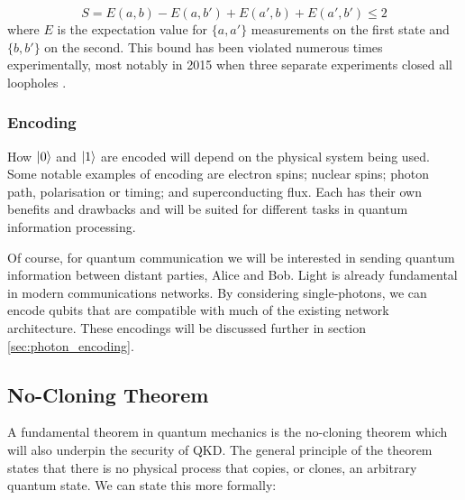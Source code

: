 \begin{equation}
	S = E(a,b) - E(a, b') + E(a',b) + E(a',b') \le 2
\end{equation}
where $E$ is the expectation value for $\{a,a'\}$ measurements on the first state and $\{b,b'\}$ on the second. This bound has been violated numerous times experimentally, most notably in 2015 when three separate experiments closed all loopholes \cite{Giustina2015, shalm2015, hensen2015}.

\subsubsection{Encoding}

How $\ket{0}$ and $\ket{1}$ are encoded will depend on the physical system being used. Some notable examples of encoding are electron spins; nuclear spins; photon path, polarisation or timing; and superconducting flux. Each has their own benefits and drawbacks and will be suited for different tasks in quantum information processing. 

Of course, for quantum communication we will be interested in sending quantum information between distant parties, Alice and Bob. Light is already fundamental in modern communications networks. By considering single-photons, we can encode qubits that are compatible with much of the existing network architecture. These encodings will be discussed further in section \ref{sec:photon_encoding}.




\subsection{No-Cloning Theorem}

A fundamental theorem in quantum mechanics is the {\color{bristol-red} no-cloning theorem} which will also underpin the security of \ac{QKD}. The general principle of the theorem states that there is no physical process that copies, or clones, an arbitrary quantum state. We can state this more formally:

